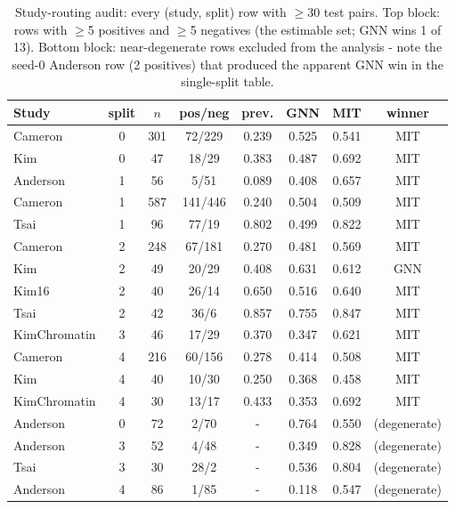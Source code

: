 \begin{table}[h]\centering\small\caption{Study-routing audit: every (study, split) row with $\ge$30 test pairs. Top block: rows with $\ge$5 positives and $\ge$5 negatives (the estimable set; GNN wins 1 of 13). Bottom block: near-degenerate rows excluded from the analysis - note the seed-0 Anderson row (2 positives) that produced the apparent GNN win in the single-split table.}\label{tab:routing}
\begin{tabular}{lccccccc}\hline
Study & split & $n$ & pos/neg & prev. & GNN & MIT & winner \\\hline
Cameron & 0 & 301 & 72/229 & 0.239 & 0.525 & 0.541 & MIT \\
Kim & 0 & 47 & 18/29 & 0.383 & 0.487 & 0.692 & MIT \\
Anderson & 1 & 56 & 5/51 & 0.089 & 0.408 & 0.657 & MIT \\
Cameron & 1 & 587 & 141/446 & 0.240 & 0.504 & 0.509 & MIT \\
Tsai & 1 & 96 & 77/19 & 0.802 & 0.499 & 0.822 & MIT \\
Cameron & 2 & 248 & 67/181 & 0.270 & 0.481 & 0.569 & MIT \\
Kim & 2 & 49 & 20/29 & 0.408 & 0.631 & 0.612 & GNN \\
Kim16 & 2 & 40 & 26/14 & 0.650 & 0.516 & 0.640 & MIT \\
Tsai & 2 & 42 & 36/6 & 0.857 & 0.755 & 0.847 & MIT \\
KimChromatin & 3 & 46 & 17/29 & 0.370 & 0.347 & 0.621 & MIT \\
Cameron & 4 & 216 & 60/156 & 0.278 & 0.414 & 0.508 & MIT \\
Kim & 4 & 40 & 10/30 & 0.250 & 0.368 & 0.458 & MIT \\
KimChromatin & 4 & 30 & 13/17 & 0.433 & 0.353 & 0.692 & MIT \\
\hline
Anderson & 0 & 72 & 2/70 & - & 0.764 & 0.550 & (degenerate) \\
Anderson & 3 & 52 & 4/48 & - & 0.349 & 0.828 & (degenerate) \\
Tsai & 3 & 30 & 28/2 & - & 0.536 & 0.804 & (degenerate) \\
Anderson & 4 & 86 & 1/85 & - & 0.118 & 0.547 & (degenerate) \\
\hline\end{tabular}\end{table}
